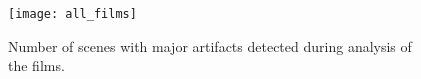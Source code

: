 \begin{figure}[!h]
	\begin{minipage}[b]{1.0\linewidth}
		\centering
		\centerline{ \texttt{[image: all\_films]} }
	\end{minipage}
    \caption{Number of scenes with major artifacts detected during analysis of the films.}
	\label{fig:results}
\end{figure}
